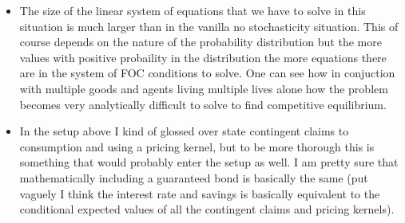 \documentclass[11pt,english]{article}
\begin{document}
\begin{itemize}
	\item The size of the linear system of equations that we have to solve in this situation is much larger than in the vanilla no stochasticity situation. This of course depends on the nature of the probability distribution but the more values with positive probaility in the distribution the more equations there are in the system of FOC conditions to solve. One can see how in conjuction with multiple goods and agents living multiple lives alone how the problem becomes very analytically difficult to solve to find competitive equilibrium.

	\item In the setup above I kind of glossed over state contingent claims to consumption and using a pricing kernel, but to be more thorough this is something that would probably enter the setup as well. I am pretty sure that mathematically including a guaranteed bond is basically the same (put vaguely I think the interest rate and savings is basically equivalent to the conditional expected values of all the contingent claims and pricing kernels).
\end{itemize}
\end{document}
